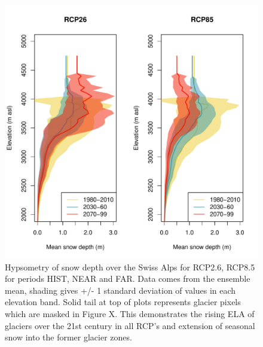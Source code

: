 \documentclass[hess, manuscript]{copernicus}
\begin{document}
\begin{figure}[t]
\includegraphics[width=18cm]{"plots/hypsometry_HS.pdf"}
\caption{Hypsometry of snow depth over the Swiss Alps for RCP2.6, RCP8.5 for periods HIST, NEAR and FAR. Data comes from the ensemble mean, shading gives +/- 1 standard deviation of values in each elevation band. Solid tail at top of plots represents glacier pixels which are masked in Figure X. This demonstrates the rising ELA of glaciers over the 21st century in all RCP's and extension of seasonal snow into the former glacier zones. }
\end{figure}

\end{document}
